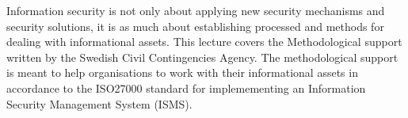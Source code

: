 Information security is not only about applying new security mechanisms and
security solutions, it is as much about establishing processed and methods for
dealing with informational assets. This lecture covers the Methodological
support written by the Swedish Civil Contingencies Agency. The methodological
support is meant to help organisations to work with their informational assets
in accordance to the ISO27000 standard for implemementing an Information
Security Management System (ISMS).
